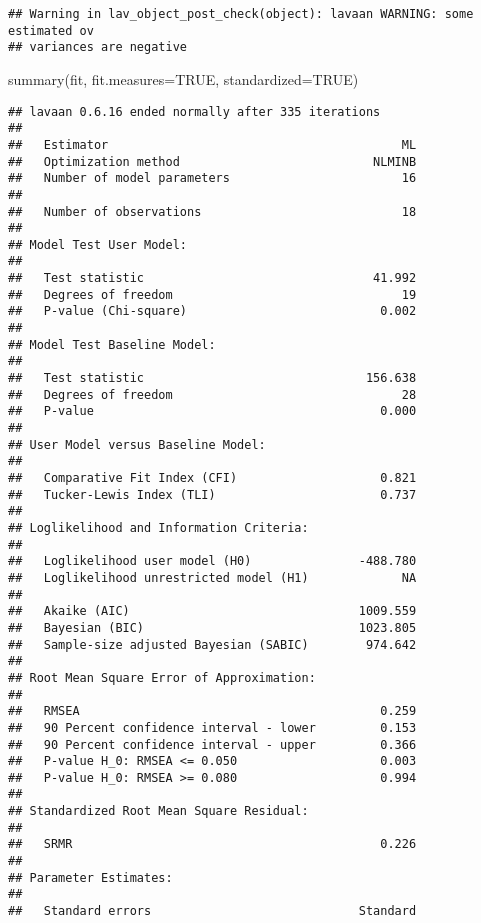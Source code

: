 \documentclass[
]{article}
\newenvironment{Shaded}{\begin{snugshade}}{\end{snugshade}}
\newcommand{\AttributeTok}[1]{\textcolor[rgb]{0.77,0.63,0.00}{#1}}
\newcommand{\ConstantTok}[1]{\textcolor[rgb]{0.00,0.00,0.00}{#1}}
\newcommand{\FunctionTok}[1]{\textcolor[rgb]{0.00,0.00,0.00}{#1}}
\newcommand{\NormalTok}[1]{#1}
\begin{document}
\begin{verbatim}
## Warning in lav_object_post_check(object): lavaan WARNING: some estimated ov
## variances are negative
\end{verbatim}

\begin{Shaded}
\begin{Highlighting}[]
\FunctionTok{summary}\NormalTok{(fit, }\AttributeTok{fit.measures=}\ConstantTok{TRUE}\NormalTok{, }\AttributeTok{standardized=}\ConstantTok{TRUE}\NormalTok{)}
\end{Highlighting}
\end{Shaded}

\begin{verbatim}
## lavaan 0.6.16 ended normally after 335 iterations
## 
##   Estimator                                         ML
##   Optimization method                           NLMINB
##   Number of model parameters                        16
## 
##   Number of observations                            18
## 
## Model Test User Model:
##                                                       
##   Test statistic                                41.992
##   Degrees of freedom                                19
##   P-value (Chi-square)                           0.002
## 
## Model Test Baseline Model:
## 
##   Test statistic                               156.638
##   Degrees of freedom                                28
##   P-value                                        0.000
## 
## User Model versus Baseline Model:
## 
##   Comparative Fit Index (CFI)                    0.821
##   Tucker-Lewis Index (TLI)                       0.737
## 
## Loglikelihood and Information Criteria:
## 
##   Loglikelihood user model (H0)               -488.780
##   Loglikelihood unrestricted model (H1)             NA
##                                                       
##   Akaike (AIC)                                1009.559
##   Bayesian (BIC)                              1023.805
##   Sample-size adjusted Bayesian (SABIC)        974.642
## 
## Root Mean Square Error of Approximation:
## 
##   RMSEA                                          0.259
##   90 Percent confidence interval - lower         0.153
##   90 Percent confidence interval - upper         0.366
##   P-value H_0: RMSEA <= 0.050                    0.003
##   P-value H_0: RMSEA >= 0.080                    0.994
## 
## Standardized Root Mean Square Residual:
## 
##   SRMR                                           0.226
## 
## Parameter Estimates:
## 
##   Standard errors                             Standard

\end{verbatim}
\end{document}
